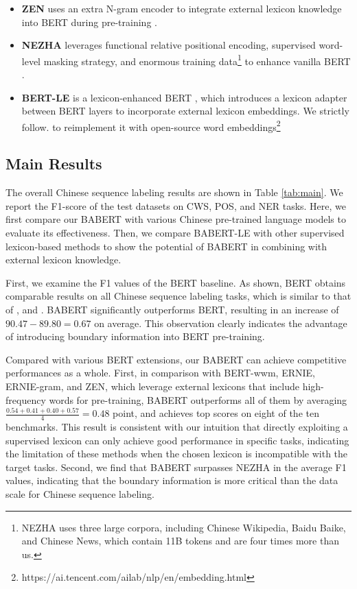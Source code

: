 \documentclass[11pt]{article}
\begin{document}
\begin{CJK}{UTF8}{gbsn}
\begin{itemize}
  \item \textbf{ZEN} uses an extra N-gram encoder to integrate external lexicon knowledge into BERT during pre-training \cite{diao-etal-2020-zen}.



  \item \textbf{NEZHA} leverages functional relative positional encoding, supervised word-level masking strategy, and enormous training data\footnote{NEZHA uses three large corpora, including Chinese Wikipedia, Baidu Baike, and Chinese News, which contain 11B tokens and are four times more than us.}
  to enhance vanilla BERT \cite{wei2019nezha}.

  \item \textbf{BERT-LE} is a lexicon-enhanced BERT \cite{liu-etal-2021-lexicon},
  which introduces a lexicon adapter between BERT layers to incorporate external lexicon embeddings.
  We strictly follow.\citet{liu-etal-2021-lexicon} to reimplement it with open-source word embeddings\footnote{https://ai.tencent.com/ailab/nlp/en/embedding.html}
\end{itemize}


\subsection{Main Results}
The overall Chinese sequence labeling results are shown in Table \ref{tab:main}.
We report the F1-score of the test datasets on CWS, POS, and NER tasks.
Here, we first compare our BABERT with various Chinese pre-trained language models to evaluate its effectiveness.
Then, we compare BABERT-LE with other supervised lexicon-based methods to show the potential of BABERT in combining with external lexicon knowledge.

First, we examine the F1 values of the BERT baseline.
As shown, BERT obtains comparable results on all Chinese sequence labeling tasks,
which is similar to that of \citet{diao-etal-2020-zen}, \citet{tian-etal-2020-joint-chinese} and \citet{liu-etal-2021-lexicon}.
BABERT significantly outperforms BERT, resulting in an increase of $90.47 - 89.80 = 0.67$ on average.
This observation clearly indicates the advantage of introducing boundary information into BERT pre-training.

Compared with various BERT extensions,
our BABERT can achieve competitive performances as a whole.
First, in comparison with BERT-wwm, ERNIE, ERNIE-gram, and ZEN,
which leverage external lexicons that include high-frequency words for pre-training,
BABERT outperforms all of them by averaging $\frac{0.54+0.41+0.40+0.57}{4} = 0.48 $  point, and achieves top scores on eight of the ten benchmarks.
This result is consistent with our intuition that directly exploiting a supervised lexicon can only achieve good performance in specific tasks,
indicating the limitation of these methods when the chosen lexicon is incompatible with the target tasks.
Second, we find that BABERT surpasses NEZHA in the average F1 values,
indicating that the boundary information is more critical than the data scale for Chinese sequence labeling.



\end{CJK}
\end{document}
